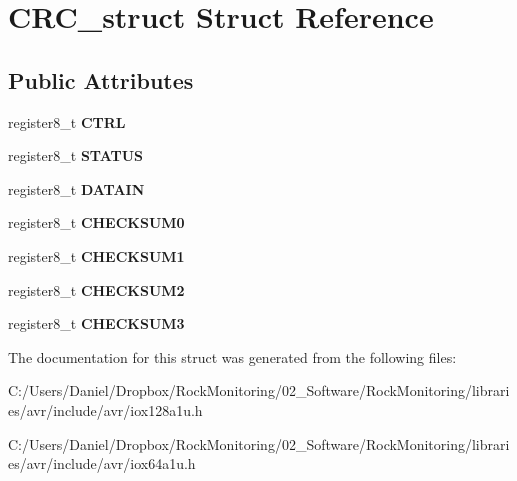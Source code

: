 \hypertarget{struct_c_r_c__struct}{}\section{C\+R\+C\+\_\+struct Struct Reference}
\label{struct_c_r_c__struct}
\subsection*{Public Attributes}
\begin{DoxyCompactItemize}
\item 
register8\+\_\+t {\bfseries C\+T\+RL}\hypertarget{struct_c_r_c__struct_aadab3b67b4ab0d08fe628a1793883907}{}\label{struct_c_r_c__struct_aadab3b67b4ab0d08fe628a1793883907}

\item 
register8\+\_\+t {\bfseries S\+T\+A\+T\+US}\hypertarget{struct_c_r_c__struct_a10689b822443633c8010e6bf029219d8}{}\label{struct_c_r_c__struct_a10689b822443633c8010e6bf029219d8}

\item 
register8\+\_\+t {\bfseries D\+A\+T\+A\+IN}\hypertarget{struct_c_r_c__struct_aaac8945c4164ae2c5393b8fb05ae3e34}{}\label{struct_c_r_c__struct_aaac8945c4164ae2c5393b8fb05ae3e34}

\item 
register8\+\_\+t {\bfseries C\+H\+E\+C\+K\+S\+U\+M0}\hypertarget{struct_c_r_c__struct_a3059a820b838147ae5cb5be948da23d9}{}\label{struct_c_r_c__struct_a3059a820b838147ae5cb5be948da23d9}

\item 
register8\+\_\+t {\bfseries C\+H\+E\+C\+K\+S\+U\+M1}\hypertarget{struct_c_r_c__struct_ac18946260f1506b1ae4aebad95f1f57f}{}\label{struct_c_r_c__struct_ac18946260f1506b1ae4aebad95f1f57f}

\item 
register8\+\_\+t {\bfseries C\+H\+E\+C\+K\+S\+U\+M2}\hypertarget{struct_c_r_c__struct_a8ef0e17283e14b5202c1b2c5fa3e19fd}{}\label{struct_c_r_c__struct_a8ef0e17283e14b5202c1b2c5fa3e19fd}

\item 
register8\+\_\+t {\bfseries C\+H\+E\+C\+K\+S\+U\+M3}\hypertarget{struct_c_r_c__struct_ad55607ab72838536a385691aec18dc41}{}\label{struct_c_r_c__struct_ad55607ab72838536a385691aec18dc41}

\end{DoxyCompactItemize}


The documentation for this struct was generated from the following files\+:\begin{DoxyCompactItemize}
\item 
C\+:/\+Users/\+Daniel/\+Dropbox/\+Rock\+Monitoring/02\+\_\+\+Software/\+Rock\+Monitoring/libraries/avr/include/avr/iox128a1u.\+h\item 
C\+:/\+Users/\+Daniel/\+Dropbox/\+Rock\+Monitoring/02\+\_\+\+Software/\+Rock\+Monitoring/libraries/avr/include/avr/iox64a1u.\+h\end{DoxyCompactItemize}
